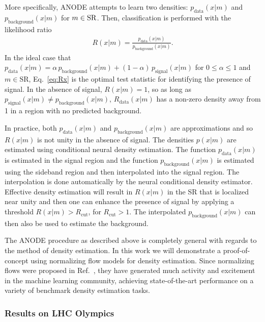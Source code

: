 \documentclass[a4paper,11pt]{article}
\begin{document}
More specifically, ANODE attempts to learn two densities: $p_\text{data}(x|m)$ and $p_\text{background}(x|m)$ for $m\in {\rm SR}$.  Then, classification is performed with the likelihood ratio
\begin{align}
\label{eq:Rx}
R(x|m)=\frac{p_\text{data}(x|m)}{p_\text{background}(x|m)}.
\end{align}
In the ideal case that $p_\text{data}(x|m)=\alpha\, p_\text{background}(x|m)+(1-\alpha)\,p_\text{signal}(x|m)$ for $0\leq\alpha\leq 1$ and $m\in\text{SR}$, Eq.~\ref{eq:Rx} is the optimal test statistic for identifying the presence of signal.  In the absence of signal, $R(x|m)=1$, so as long as $p_\text{signal}(x|m)\neq p_\text{background}(x|m)$, $R_\text{data}(x|m)$ has a non-zero density away from 1 in a region with no predicted background.

In practice, both $p_\text{data}(x|m)$ and $p_\text{background}(x|m)$ are approximations and so $R(x|m)$ is not unity in the absence of signal.  The densities $p(x|m)$ are estimated using conditional neural density estimation.  The function $p_\text{data}(x|m)$ is estimated in the signal region and the function $p_\text{background}(x|m)$ is estimated using the sideband region and then interpolated into the signal region.  The interpolation is done automatically by the neural conditional density estimator.  Effective density estimation will result in $R(x|m)$ in the SR that is localized near unity and then one can enhance the presence of signal by applying a threshold $R(x|m)>R_\text{cut}$, for $R_\text{cut}>1$.  The interpolated $p_\text{background}(x|m)$ can then also be used to estimate the background.

The ANODE procedure as described above is completely general with regards to the method of density estimation. In this work we will demonstrate a proof-of-concept using normalizing flow models for density estimation. Since normalizing flows were proposed in Ref.~\cite{pmlr-v37-rezende15}, they have generated much activity and excitement in the machine learning community, achieving state-of-the-art performance on a variety of benchmark density estimation tasks. 

\subsubsection{Results on LHC Olympics}
\end{document}
